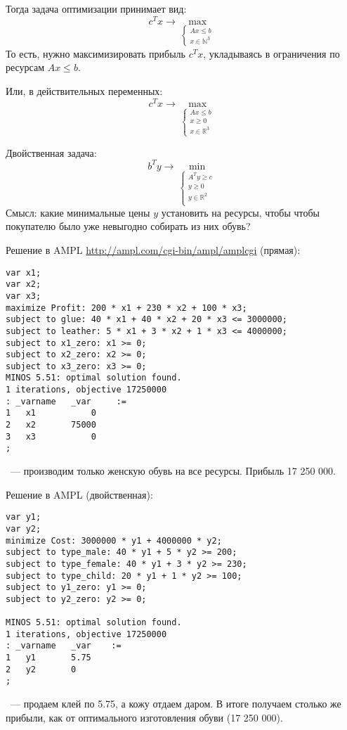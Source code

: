 \documentclass[a4paper]{article}
\begin{document}
Тогда задача оптимизации принимает вид:
$$c^Tx\to\max_{\begin{cases}
Ax\leqslant b\\x\in\mathbb{N}^3
	\end{cases}}$$
То есть, нужно максимизировать прибыль $c^Tx$, укладываясь в ограничения по ресурсам $Ax\leqslant b$.


Или, в действительных переменных:
$$c^Tx\to\max_{\begin{cases}
	Ax\leqslant b\\x\geqslant 0\\x\in\mathbb{R}^3
	\end{cases}}$$

Двойственная задача:
$$b^Ty\to\min_{\begin{cases}
A^Ty\geqslant c\\
y\geqslant 0\\
y\in\mathbb{R}^2\\
\end{cases}}$$
Смысл: какие минимальные цены $y$ установить на ресурсы, чтобы чтобы покупателю было уже невыгодно собирать из них обувь?

Решение в AMPL \url{http://ampl.com/cgi-bin/ampl/amplcgi} (прямая):
\begin{verbatim}
var x1;
var x2;
var x3;
maximize Profit: 200 * x1 + 230 * x2 + 100 * x3;
subject to glue: 40 * x1 + 40 * x2 + 20 * x3 <= 3000000;
subject to leather: 5 * x1 + 3 * x2 + 1 * x3 <= 4000000;
subject to x1_zero: x1 >= 0;
subject to x2_zero: x2 >= 0;
subject to x3_zero: x3 >= 0;
MINOS 5.51: optimal solution found.
1 iterations, objective 17250000
: _varname   _var     :=
1   x1           0
2   x2       75000
3   x3           0
;
\end{verbatim}
~--- производим только женскую обувь на все ресурсы. Прибыль 17 250 000.

Решение в AMPL (двойственная):
\begin{verbatim}
var y1;
var y2;
minimize Cost: 3000000 * y1 + 4000000 * y2;
subject to type_male: 40 * y1 + 5 * y2 >= 200;
subject to type_female: 40 * y1 + 3 * y2 >= 230;
subject to type_child: 20 * y1 + 1 * y2 >= 100;
subject to y1_zero: y1 >= 0;
subject to y2_zero: y2 >= 0;

MINOS 5.51: optimal solution found.
1 iterations, objective 17250000
: _varname   _var    :=
1   y1       5.75
2   y2       0
;
\end{verbatim}
~--- продаем клей по 5.75, а кожу отдаем даром. В итоге получаем столько же прибыли, как от оптимального изготовления обуви (17 250 000).
\end{document}
